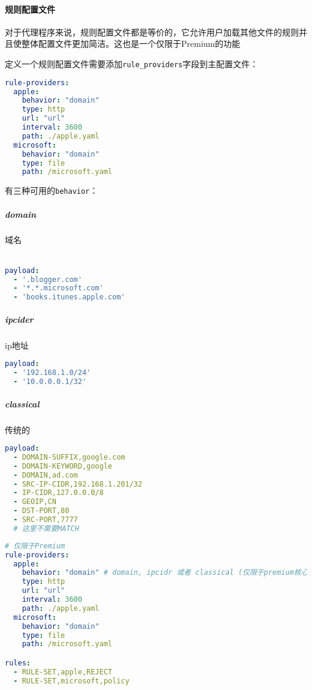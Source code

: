 \paragraph{规则配置文件} 对于代理程序来说，规则配置文件都是等价的，它允许用户加载其他文件的规则并且使整体配置文件更加简洁。这也是一个仅限于Premium的功能

定义一个规则配置文件需要添加\verb|rule_providers|字段到主配置文件：\\

\begin{lstlisting}[breaklines=true,language=yaml,style=yaml]
rule-providers:
  apple:
    behavior: "domain"
    type: http
    url: "url"
    interval: 3600
    path: ./apple.yaml
  microsoft:
    behavior: "domain"
    type: file
    path: /microsoft.yaml
\end{lstlisting}


有三种可用的\verb|behavior|：
\subparagraph{domain}域名\\ \\

\begin{lstlisting}[breaklines=true,language=yaml,style=yaml]
payload:
  - '.blogger.com'
  - '*.*.microsoft.com'
  - 'books.itunes.apple.com'
\end{lstlisting}


\subparagraph{ipcider}ip地址\\

\begin{lstlisting}[breaklines=true,language=yaml,style=yaml]
payload:
  - '192.168.1.0/24'
  - '10.0.0.0.1/32'
\end{lstlisting}


\subparagraph{classical}传统的\\

\begin{lstlisting}[breaklines=true,language=yaml,style=yaml]
payload:
  - DOMAIN-SUFFIX,google.com
  - DOMAIN-KEYWORD,google
  - DOMAIN,ad.com
  - SRC-IP-CIDR,192.168.1.201/32
  - IP-CIDR,127.0.0.0/8
  - GEOIP,CN
  - DST-PORT,80
  - SRC-PORT,7777
  # 这里不需要MATCH
\end{lstlisting}



\begin{lstlisting}[breaklines=true,language=yaml,style=yaml]
# 仅限于Premium
rule-providers:
  apple:
    behavior: "domain" # domain, ipcidr 或者 classical (仅限于premium核心 )
    type: http
    url: "url"
    interval: 3600
    path: ./apple.yaml
  microsoft:
    behavior: "domain"
    type: file
    path: /microsoft.yaml

rules:
  - RULE-SET,apple,REJECT
  - RULE-SET,microsoft,policy
\end{lstlisting}


